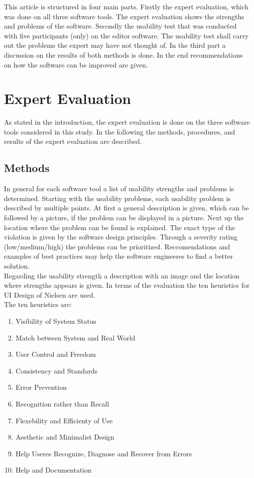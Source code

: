\documentclass[]{article}
\begin{document}
\noindent This article is structured in four main parts. Firstly the expert evaluation, which was done on all three software tools. The expert evaluation shows the strengths and problems of the software. Secondly the usability test that was conducted with five participants (only) on the editor software. The usability test shall carry out the problems the expert may have not thought of. In the third part a discussion on the results of both methods is done. In the end recommendations on how the software can be improved are given.

\newpage
\section{Expert Evaluation}
As stated in the introduction, the expert evaluation is done on the three software tools considered in this study. In the following the methods, procedures, and results of the expert evaluation are described.

\subsection{Methods} \label{expert_eval_methods}
In general for each software tool a list of usability strengths and problems is determined. Starting with the usability problems, each usability problem is described by multiple points. At first a general description is given, which can be followed by a picture, if the problem can be displayed in a picture. Next up the location where the problem can be found is explained. The exact type of the violation is given by the software design principles. Through a severity rating (low/medium/high) the problems can be prioritized. Reccomendations and examples of best practices may help the software engineeres to find a better solution.\\
Regarding the usability strength a description with an image and the location where  strengths appears is given.
In terms of the evaluation the ten heuristics for UI Design of Nielsen are used.\\
The ten heuristics are:

\begin{enumerate}
	\item Visibility of System Status
	\item Match between System and Real World
	\item User Control and Freedom
	\item Consistency and Standards
	\item Error Prevention
	\item Recognition rather than Recall
	\item Flexebility and Efficienty of Use
	\item Aesthetic and Minimalist Design
	\item Help Useres Recognize, Diagnose and Recover from Errors
	\item Help and Documentation
\end{enumerate}
\end{document}
